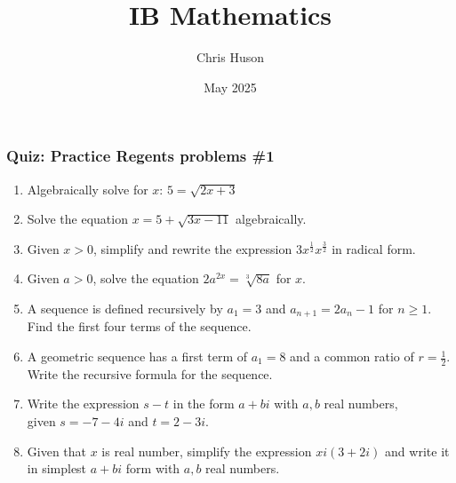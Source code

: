 \documentclass[12pt, twoside]{article}
\title{IB Mathematics}
\author{Chris Huson}
\date{May 2025}
\begin{document}
\subsubsection*{Quiz: Practice Regents problems \#1}

\begin{enumerate}
\item Algebraically solve for $x$: $5 = \sqrt{2x+3}$
\vspace{9cm}

\item Solve the equation $x = 5+\sqrt{3x-11}$ algebraically.

\newpage

\item Given $x > 0$, simplify and rewrite the expression $\displaystyle 3x^{\frac{1}{2}}x^{\frac{3}{2}}$ in radical form.
\vspace{9cm}

\item Given $a > 0$, solve the equation $2a^{2x} = \sqrt[3]{8a}$ for $x$.

\newpage
\item A sequence is defined recursively by \( a_1 = 3 \) and \( a_{n+1} = 2a_n - 1 \) for \( n \geq 1 \). Find the first four terms of the sequence.
\vspace{9cm}

\item A geometric sequence has a first term of \( a_1 = 8 \) and a common ratio of \( r = \frac{1}{2} \). Write the recursive formula for the sequence.


\newpage
\item Write the expression $s-t$ in the form $a+bi$ with $a,b$ real numbers, \\
given  $s = -7 - 4i $ and $t = 2 - 3i$.
\vspace{9cm}

\item Given that $x$ is real number, simplify the expression $xi(3+2i)$ and write it in simplest $a+bi$ form with $a,b$ real numbers.

\vspace{3cm}

\end{enumerate}
\end{document}
